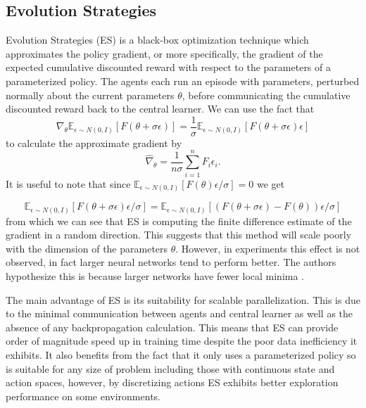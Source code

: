 \subsection{Evolution Strategies}
Evolution Strategies (ES) \cite{ES} is a black-box optimization technique which approximates the policy gradient, or more specifically, the gradient of the expected cumulative discounted reward with respect to the parameters of a parameterized policy.
The agents each run an episode with parameters, perturbed normally about the current parameters $\theta$, before communicating the cumulative discounted reward back to the central learner.
We can use the fact that
\begin{equation*}
        \nabla_\theta \mathbb{E}_{\epsilon \sim N(0,I)}[F(\theta+\sigma \epsilon)] = \frac{1}{\sigma}\mathbb{E}_{\epsilon \sim N(0,I)}[F(\theta+\sigma \epsilon) \epsilon]
\end{equation*}
to calculate the approximate gradient by
\begin{equation}
        \hat{\nabla}_\theta = \frac{1}{n\sigma}\sum^n_{i=1} F_i \epsilon_i.
        \label{eq:grad}
\end{equation}
It is useful to note that since $\mathbb{E}_{\epsilon \sim N(0,I)}[F(\theta)\epsilon/\sigma] = 0$ we get

\begin{equation*}
    \mathbb{E}_{\epsilon \sim N(0,I)}[F(\theta+\sigma \epsilon) \epsilon/\sigma] = \mathbb{E}_{\epsilon \sim N(0,I)}[(F(\theta+\sigma \epsilon) - F(\theta))\epsilon/\sigma]
\end{equation*}
from which we can see that ES is computing the finite difference estimate of the gradient in a random direction. This suggests that this method will scale poorly with the dimension of the parameters $\theta$. However, in experiments this effect is not observed, in fact larger neural networks tend to perform better. The authors hypothesize this is because larger networks have fewer local minima \cite{LocalMinima}.

The main advantage of ES is its suitability for scalable parallelization. This is due to the minimal communication between agents and central learner as well as the absence of any backpropagation calculation. This means that ES can provide order of magnitude speed up in training time despite the poor data inefficiency it exhibits. It also benefits from the fact that it only uses a parameterized policy so is suitable for any size of problem including those with continuous state and action spaces, however, by discretizing actions ES exhibits better exploration performance on some environments.

